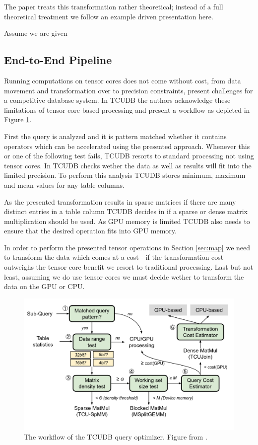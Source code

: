 \documentclass{paper}
\begin{document}
	The paper \cite{hu2021tcudb} treats this transformation rather theoretical; instead of a full theoretical treatment we follow an example driven presentation here.
	
	Assume we are given 
	
	\subsection{End-to-End Pipeline}
	
	Running computations on tensor cores does not come without cost, from data movement and transformation over to precision constraints, present challenges for a competitive database system. In TCUDB the authors acknowledge these limitations of tensor core based processing and present a workflow as depicted in Figure \ref{fig:pipeline}.

	First the query is analyzed  and it is pattern matched whether it contains operators which can be accelerated using the presented approach. Whenever this or one of the following test fails, TCUDB resorts to standard processing not using tensor cores. In  TCUDB checks wether the data as well as results will fit into the limited precision. To perform this analysis TCUDB stores minimum, maximum and mean values for any table columns.
	
	As the presented transformation results in sparse matrices if there are many distinct entries in a table column TCUDB decides in  if a sparse or dense matrix multiplication should be used. As GPU memory is limited TCUDB also needs to ensure that  the desired operation fits into GPU memory.
	
	In order to perform the presented tensor operations in Section \ref{sec:map} we need to transform the data which comes at a cost - if the transformation cost outweighs the tensor core benefit  we resort to traditional processing. Last but not least, assuming we do use tensor cores we must decide  wether to transform the data on the GPU or CPU.
	
	\begin{figure}
		\centering
		\includegraphics[width=0.9\linewidth]{pipeline}
		\caption{The workflow of the TCUDB query optimizer. Figure from \cite{hu2021tcudb}.} 
		\label{fig:pipeline}
	\end{figure}
	
\end{document}

